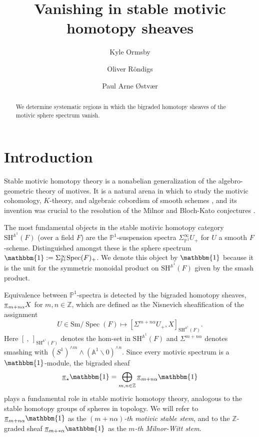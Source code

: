 \documentclass[10pt]{amsart}
\numberwithin{equation}{section}
\theoremstyle{plain}
\theoremstyle{definition}
\theoremstyle{remark}
\begin{document}
\title{Vanishing in stable motivic homotopy sheaves}
\author{Kyle Ormsby}
\address{Reed College}
\author{Oliver R\"{o}ndigs}
\address{Universit\"{a}t Osnabr\"{u}ck}
\author{Paul Arne {\O}stv{\ae}r}
\address{University of Oslo}
\begin{abstract}
We determine systematic regions in which the bigraded homotopy sheaves of the motivic sphere spectrum vanish.
\end{abstract}

\maketitle

\section{Introduction}\label{sec:intro}
Stable motivic homotopy theory is a nonabelian generalization of the algebro-geometric theory of motives.  It is a natural arena in which to study the motivic cohomology, $K$-theory, and algebraic cobordism of smooth schemes \cite{v:icm}, and its invention was crucial to the resolution of the Milnor and Bloch-Kato conjectures \cite{v:2,v:l}.

The most fundamental objects in the stable motivic homotopy category ${\mathrm{SH}^{{\mathbb{A}}^1}\!}(F)$ (over a field $F$) are the ${\mathbb{P}}^1$-suspension spectra $\Sigma^\infty_{{\mathbb{P}}^1}U_+$ for $U$ a smooth $F$-scheme.  Distinguished amongst these is the sphere spectrum ${\mathbbm{1}} := \Sigma^{\infty}_{{\mathbb{P}}^1}{\operatorname{Spec}}(F)_+$.  We denote this object by ${\mathbbm{1}}$ because it is the unit for the symmetric monoidal product on ${\mathrm{SH}^{{\mathbb{A}}^1}\!}(F)$ given by the smash product.

Equivalence between ${\mathbb{P}}^1$-spectra is detected by the bigraded homotopy sheaves, ${\underline{\smash{\pi}}}_{m+n\alpha}X$ for $m,n\in{\mathbb{Z}}$, which are defined as the Nisnevich sheafification of the assignment
\[
 U\in {\mathrm{Sm}}/{\operatorname{Spec}}(F)\longmapsto [\Sigma^{m+n\alpha} U_+,X]_{{\mathrm{SH}^{{\mathbb{A}}^1}\!}(F)}.
\]
Here $[~,~]_{{\mathrm{SH}^{{\mathbb{A}}^1}\!}(F)}$ denotes the hom-set in ${\mathrm{SH}^{{\mathbb{A}}^1}\!}(F)$ and $\Sigma^{m+n\alpha}$ denotes smashing with $(S^1)^{\wedge m}\wedge({\mathbb{A}}^1\smallsetminus 0)^{\wedge n}$.  Since every motivic spectrum is a ${\mathbbm{1}}$-module, the bigraded sheaf
\[
  {\underline{\smash{\pi}}}_\star {\mathbbm{1}} = \bigoplus_{m,n\in {\mathbb{Z}}}{\underline{\smash{\pi}}}_{m+n\alpha}{\mathbbm{1}}
\]
plays a fundamental role in stable motivic homotopy theory, analogous to the stable homotopy groups of spheres in topology.  We will refer to ${\underline{\smash{\pi}}}_{m+n\alpha}{\mathbbm{1}}$ as the \emph{$(m+n\alpha)$-th motivic stable stem}, and to the ${\mathbb{Z}}$-graded sheaf ${\underline{\smash{\pi}}}_{m+*\alpha}{\mathbbm{1}}$ as the \emph{$m$-th Milnor-Witt stem}.
\end{document}
